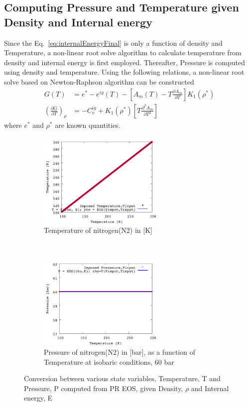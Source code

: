 \documentclass[11pt]{article}
\begin{document}
\subsection{Computing Pressure and Temperature given Density and Internal energy}  
Since the Eq.~\ref{eq:internalEnergyFinal} is only a function of density and Temperature, a non-linear root solve algorithm to calculate temperature from density and internal energy is first employed. Thereafter, Pressure is computed using density and temperature. Using the following relations, a non-linear root solve based on Newton-Raphson algorithm can be constructed
\begin{align}
G\left( T \right) &= e^{*} - e^{ig}\left(T\right) - \left[ A_m(T) - T\frac{\partial A_m}{\partial T}\right]K_{1}\left(\rho^{*}\right) \\
\left(\frac{\partial G}{\partial T}\right)_{\rho} &= -C_v^{ig} + K_{1}\left(\rho^{*}\right) \left[T\frac{\partial^2 A_m}{\partial T^2} \right] 
\end{align}
where $e^{*}$ and $\rho^*$ are known quantities. 
\begin{figure}[!tbh]
    \centering
    \begin{subfigure}[t]{0.5\textwidth}
        \centering
        \includegraphics[height=1.8in]{figures/N2_NonLinear_TfromRHO_E.png}
        \caption{Temperature of nitrogen(N2) in [K]}
    \end{subfigure}%
    ~ 
    \begin{subfigure}[t]{0.5\textwidth}
        \centering
        \includegraphics[height=1.8in]{figures/N2_NonLinear_PfromRHO_E.png}
        \caption{Pressure of nitrogen(N2) in [bar], as a function of Temperature at isobaric conditions, 60 bar}
    \end{subfigure}
    \caption{Conversion between various state variables, Temperature, T and Pressure, P computed from PR EOS, given Density, $\rho$ and Internal energy, E}
\end{figure}
\appendix
\end{document}
